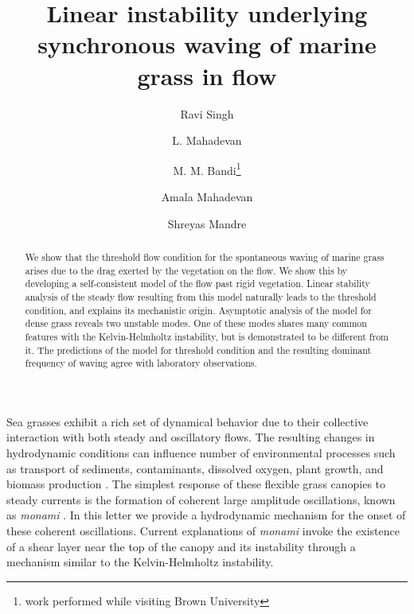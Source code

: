 \documentclass[aps,prl,twocolumn,superscriptaddress,10pt]{revtex4-1}  %
\newcommand{\monami}{\textit{monami }}
\begin{document}
\title{Linear instability underlying synchronous waving of marine grass in flow}
\author{Ravi Singh}
\author{L. Mahadevan}
\author{M. M. Bandi\thanks{work performed while visiting Brown University}}
\author{Amala Mahadevan}
\author{Shreyas Mandre}

\begin{abstract}
We show that the threshold flow condition for the spontaneous waving of marine grass arises due to the drag exerted by the vegetation on the flow. 
We show this by developing a self-consistent model of the flow past rigid vegetation. 
Linear stability analysis of the steady flow resulting from this model naturally leads to the threshold condition, and explains its mechanistic origin. 
Asymptotic analysis of the model for dense grass reveals two unstable modes. 
One of these modes shares many common features with the Kelvin-Helmholtz instability, but is demonstrated to be different from it. 
The predictions of the model for threshold condition and the resulting dominant frequency of waving agree with laboratory observations. 
\end{abstract}
\maketitle
Sea grasses exhibit a rich set of dynamical behavior due to their collective interaction with both steady and oscillatory flows.  
The resulting changes in hydrodynamic conditions can influence number of environmental processes such as transport of sediments, contaminants, dissolved oxygen, plant growth, and biomass production \cite{Fonseca87,Grizzle96,Nepf99,Nepf2012}. 
The simplest response of these flexible grass canopies to steady currents is the formation of coherent large amplitude oscillations, known as \monami \cite{AckermanOkubo93}.  
In this letter we provide a hydrodynamic mechanism for the onset of these coherent oscillations.
\newline
Current explanations of \monami invoke the existence of a shear layer near the top of the canopy \cite{Ghisal02,Raupach96} and its instability through a mechanism similar to the Kelvin-Helmholtz instability. 
\end{document}

